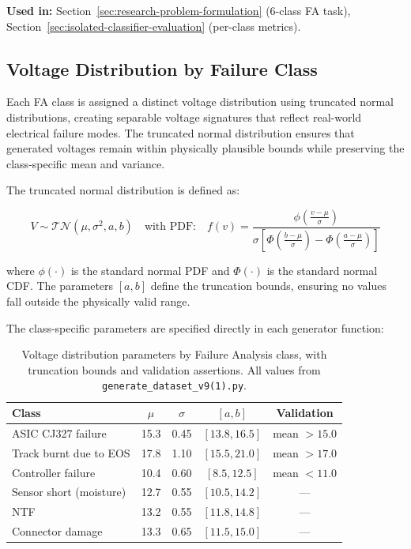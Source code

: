 \documentclass[10pt,a4paper]{article}
\begin{document}
\textbf{Used in:} Section~\ref{sec:research-problem-formulation} (6-class FA task), Section~\ref{sec:isolated-classifier-evaluation} (per-class metrics).

\subsection{Voltage Distribution by Failure Class}
\label{sec:voltage-distribution}

Each FA class is assigned a distinct voltage distribution using truncated normal distributions, creating separable voltage signatures that reflect real-world electrical failure modes. The truncated normal distribution ensures that generated voltages remain within physically plausible bounds while preserving the class-specific mean and variance.

The truncated normal distribution is defined as:

\begin{equation}
V \sim \mathcal{TN}(\mu, \sigma^2, a, b) \quad \text{with PDF:} \quad f(v) = \frac{\phi\left(\frac{v-\mu}{\sigma}\right)}{\sigma\left[\Phi\left(\frac{b-\mu}{\sigma}\right) - \Phi\left(\frac{a-\mu}{\sigma}\right)\right]}
\label{eq:truncated-normal}
\end{equation}

where $\phi(\cdot)$ is the standard normal PDF and $\Phi(\cdot)$ is the standard normal CDF. The parameters $[a, b]$ define the truncation bounds, ensuring no values fall outside the physically valid range.

The class-specific parameters are specified directly in each generator function:

\begin{table}[H]
\centering
\caption{Voltage distribution parameters by Failure Analysis class, with truncation bounds and validation assertions. All values from \texttt{generate\_dataset\_v9(1).py}.}
\label{tab:voltage-params}
\begin{tabular}{lcccc}
\toprule
\textbf{Class} & $\mu$ & $\sigma$ & $[a, b]$ & \textbf{Validation} \\
\midrule
ASIC CJ327 failure   & 15.3  & 0.45 & $[13.8, 16.5]$ & mean $> 15.0$ \\
Track burnt due to EOS & 17.8 & 1.10 & $[15.5, 21.0]$ & mean $> 17.0$ \\
Controller failure    & 10.4  & 0.60 & $[8.5, 12.5]$  & mean $< 11.0$ \\
Sensor short (moisture) & 12.7 & 0.55 & $[10.5, 14.2]$ & --- \\
NTF                   & 13.2  & 0.55 & $[11.8, 14.8]$ & --- \\
Connector damage      & 13.3  & 0.65 & $[11.5, 15.0]$ & --- \\
\bottomrule
\end{tabular}
\end{table}
\end{document}
